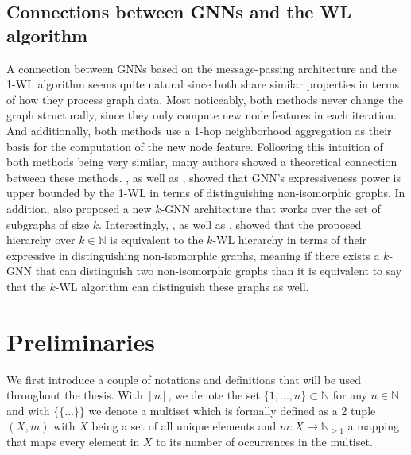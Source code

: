 \documentclass[11pt, dvipsnames, DIV=12]{scrreprt}
\theoremstyle{definition}
\newcommand{\MSopen}{\{\!\!\{}
\newcommand{\MSclose}{\}\!\!\}}
\begin{document}
\subsection{Connections between GNNs and the WL algorithm}\label{sec:conn gnn and 1wl}
A connection between GNNs based on the message-passing architecture and the 1-WL algorithm seems quite natural since both share similar properties in terms of how they process graph data. Most noticeably, both methods never change the graph structurally, since they only compute new node features in each iteration. And additionally, both methods use a 1-hop neighborhood aggregation as their basis for the computation of the new node feature. Following this intuition of both methods being very similar, many authors showed a theoretical connection between these methods. \cite{Morris2018}, as well as \cite{Xu2018}, showed that GNN's expressiveness power is upper bounded by the 1-WL in terms of distinguishing non-isomorphic graphs. In addition, \cite{Morris2018} also proposed a new $k$-GNN architecture that works over the set of subgraphs of size $k$. Interestingly, \cite{Geerts2020}, as well as \cite{Gro2017}, showed that the proposed hierarchy over $k \in \mathbb{N}$ is equivalent to the $k$-WL hierarchy in terms of their expressive in distinguishing non-isomorphic graphs, meaning if there exists a $k$-GNN that can distinguish two non-isomorphic graphs than it is equivalent to say that the $k$-WL algorithm can distinguish these graphs as well.

\section{Preliminaries}
We first introduce a couple of notations and definitions that will be used throughout the thesis. With $[n]$, we denote the set $\{1, \ldots, n\} \subset \mathbb{N}$ for any $n \in \mathbb{N}$ and with $\MSopen \ldots \MSclose$ we denote a multiset which is formally defined as a 2 tuple $(X, m)$ with $X$ being a set of all unique elements and $m: X \rightarrow \mathbb{N}_{\geq 1}$ a mapping that maps every element in $X$ to its number of occurrences in the multiset.
\end{document}
